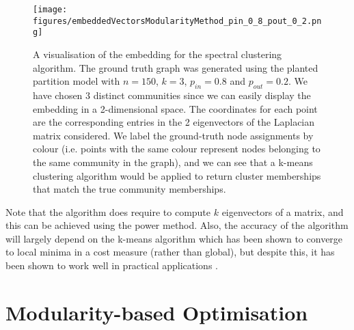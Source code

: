 \begin{figure}
	\centering
	\texttt{[image: figures/embeddedVectorsModularityMethod\_pin\_0\_8\_pout\_0\_2.png]}
	\caption[Visualisation of spectral clustering embedding.]{\label{fig:SpectralClusteringEmbeddingVisualisation} A visualisation of the embedding for the spectral clustering algorithm. The ground truth graph was generated using the planted partition model with $n=150$, $k=3$, $p_{in}=0.8$ and $p_{out}=0.2$. We have chosen $3$ distinct communities since we can easily display the embedding in a 2-dimensional space. The coordinates for each point are the corresponding entries in the 2 eigenvectors of the Laplacian matrix considered. We label the ground-truth node assignments by colour (i.e. points with the same colour represent nodes belonging to the same community in the graph), and we can see that a k-means clustering algorithm would be applied to return cluster memberships that match the true community memberships.}
\end{figure}

Note that the algorithm does require to compute $k$ eigenvectors of a matrix, and this can be achieved using the power method.
Also, the accuracy of the algorithm will largely depend on the k-means algorithm which has been shown to converge to local minima in a cost measure (rather than global), but despite this, it has been shown to work well in practical applications \cite{Lux06,For10}.


\section{Modularity-based Optimisation}
\label{sec:modularityBasedOptimisation}
 
